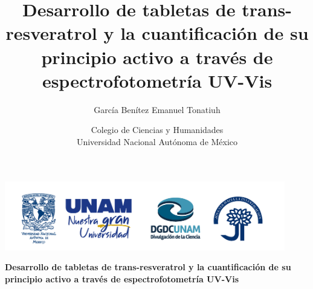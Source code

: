 \documentclass[11pt]{article}
\title{Desarrollo de tabletas de trans-resveratrol y la
cuantificación de su principio activo a través de
espectrofotometría UV-Vis}
\author{García Benítez Emanuel Tonatiuh}
\date{Colegio de Ciencias y Humanidades\\
        Universidad Nacional Autónoma de México}
\theoremstyle{mytheoremstyle}
\theoremstyle{mytheoremstyle}
\theoremstyle{myproblemstyle}
\begin{document}
\onehalfspacing

\begin{titlepage}
    \thispagestyle{empty}
    \vfill %

    \begin{center}
        \includegraphics[height=3cm]{img/Logo estancia.png}
        \hspace{2cm}
    \end{center}

    \vspace{1.5cm} %

    \begin{center}
        {\LARGE \textbf{Desarrollo de tabletas de trans-resveratrol y la cuantificación de su principio activo a través de espectrofotometría UV-Vis}}
        \vspace{1cm}


\end{center}
\end{titlepage}
\end{document}
